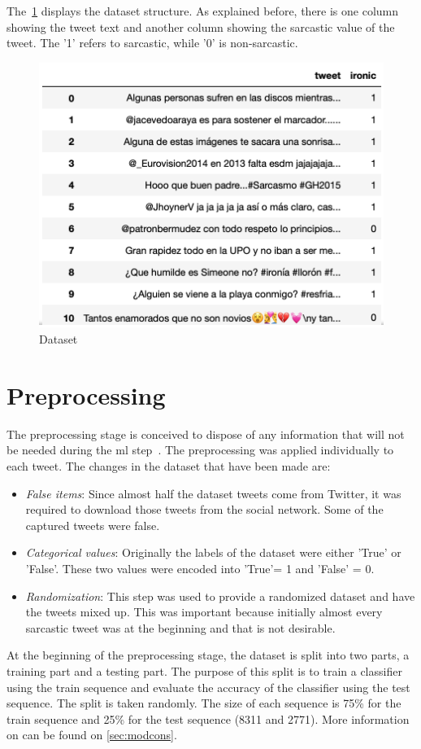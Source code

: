The~\cref{fig:dataset} displays the dataset structure. As explained before, there is one column showing the tweet text and another column showing the sarcastic value of the tweet. The '1' refers to sarcastic, while '0' is non-sarcastic.
\begin{figure}
	\includegraphics[width=\linewidth]{img/dataset.png}
	\caption{Dataset}
	\label{fig:dataset}
\end{figure}

\section{Preprocessing}
\label{sec:preprocessing}
The preprocessing stage is conceived to dispose of any information that will not be needed during the \ac{ml} step~\cite{preprocess}. The preprocessing was applied individually to each tweet.
The changes in the dataset that have been made are:
\begin{itemize}
	\item \textit{False items}: Since almost half the dataset tweets come from Twitter, it was required to download those tweets from the social network. Some of the captured tweets were false.
	\item \textit{Categorical values}: Originally the labels of the dataset were either 'True' or 'False'. These two values were encoded into 'True'= 1 and 'False' = 0.
	\item \textit{Randomization}: This step was used to provide a randomized dataset and have the tweets mixed up. This was important because initially almost every sarcastic tweet was at the beginning and that is not desirable.
\end{itemize}
At the beginning of the preprocessing stage, the dataset is split into two parts, a training part and a testing part. The purpose of this split is to train a classifier using the train sequence and evaluate the accuracy of the classifier using the test sequence. The split is taken randomly. The size of each sequence is 75\% for the train sequence and 25\% for the test sequence (8311 and 2771). More information on can be found on \cref{sec:modcons}.
